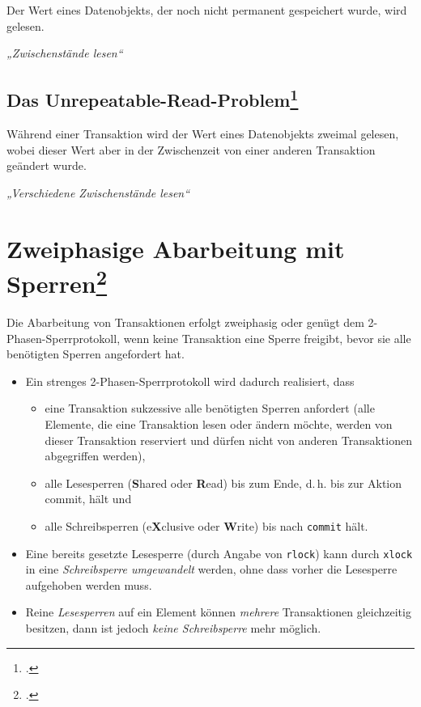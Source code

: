 \documentclass{lehramt-informatik-haupt}
\begin{document}
Der Wert eines Datenobjekts, der noch nicht permanent gespeichert wurde,
wird gelesen.

\emph{„Zwischenstände lesen“}

%

\subsection{Das Unrepeatable-Read-Problem\footcite{wiki:nichtwiederholbares-lesen}}

Während einer Transaktion wird der Wert eines Datenobjekts zweimal
gelesen, wobei dieser Wert aber in der Zwischenzeit von einer anderen
Transaktion geändert wurde.

\emph{„Verschiedene Zwischenstände lesen“}

%

\section{Zweiphasige Abarbeitung mit Sperren\footcite[Seite 15]{db:fs:5}}

Die Abarbeitung von Transaktionen erfolgt zweiphasig oder genügt dem
2-Phasen-Sperrprotokoll, wenn keine Transaktion eine Sperre freigibt,
bevor sie alle benötigten Sperren angefordert hat.

\begin{itemize}
\item Ein strenges 2-Phasen-Sperrprotokoll wird dadurch realisiert, dass

\begin{itemize}
\item eine Transaktion sukzessive alle benötigten Sperren anfordert
(alle Elemente, die eine Transaktion lesen oder ändern möchte, werden
von dieser Transaktion reserviert und dürfen nicht von anderen
Transaktionen abgegriffen werden),

\item alle Lesesperren (\textbf{S}hared oder \textbf{R}ead) bis zum
Ende, d.\,h. bis zur Aktion commit, hält und

\item alle Schreibsperren (e\textbf{X}clusive oder \textbf{W}rite) bis
nach \texttt{commit} hält.
\end{itemize}

\item Eine bereits gesetzte Lesesperre (durch Angabe von \texttt{rlock})
kann durch \texttt{xlock} in eine \emph{Schreibsperre umgewandelt}
werden, ohne dass vorher die Lesesperre aufgehoben werden muss.

\item Reine \emph{Lesesperren} auf ein Element können \emph{mehrere}
Transaktionen gleichzeitig besitzen, dann ist jedoch \emph{keine
Schreibsperre} mehr möglich.
\end{itemize}
\end{document}
